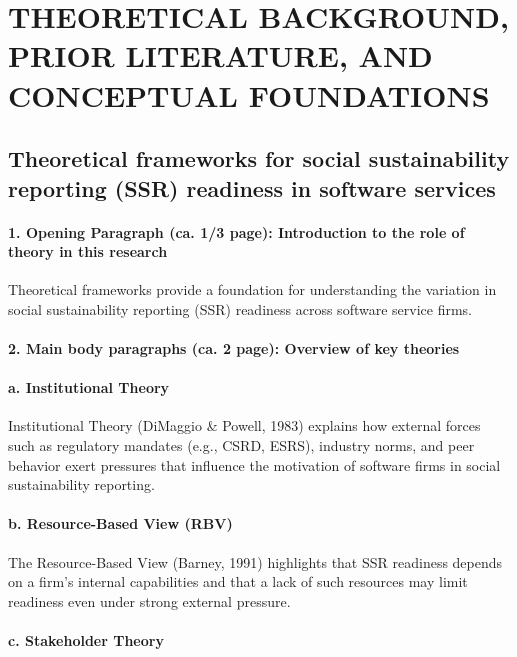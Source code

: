 \chapter{THEORETICAL BACKGROUND, PRIOR LITERATURE, AND CONCEPTUAL FOUNDATIONS}

\section{Theoretical frameworks for social sustainability reporting (SSR) readiness in software services}

\subsubsection{1. Opening Paragraph (ca. 1/3 page): Introduction to the role of theory in this research}

Theoretical frameworks provide a foundation for understanding the variation 
in social sustainability reporting (SSR) readiness across software service firms.

\subsubsection{2. Main body paragraphs (ca. 2 page): Overview of key theories}

\vspace{8pt}
    \subsubsection{a. Institutional Theory}

Institutional Theory (DiMaggio \& Powell, 1983) explains how external forces such as regulatory mandates (e.g., CSRD, ESRS),
industry norms, and peer behavior exert pressures that influence the motivation of software firms in 
social sustainability reporting.

    \subsubsection{b. Resource-Based View (RBV)}

The Resource-Based View (Barney, 1991) highlights that SSR readiness depends on a firm's internal capabilities 
and that a lack of such resources may limit readiness even under strong external pressure.

    \subsubsection{c. Stakeholder Theory}

